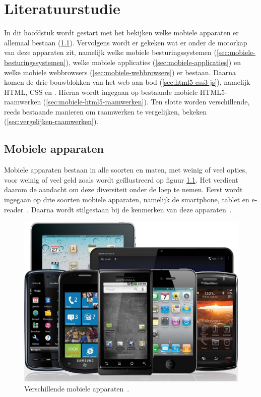 \chapter{Literatuurstudie}
\label{chap:literatuurstudie}
In dit hoofdstuk wordt gestart met het bekijken welke mobiele apparaten er allemaal bestaan (\ref{sec:mobiele-apparaten}). 
Vervolgens wordt er gekeken wat er onder de motorkap van deze apparaten zit, namelijk welke mobiele besturingssystemen (\ref{sec:mobiele-besturingssystemen}), welke mobiele applicaties (\ref{sec:mobiele-applicaties}) en welke mobiele webbrowsers (\ref{sec:mobiele-webbrowsers}) er bestaan. 
Daarna komen de drie bouwblokken van het web aan bod (\ref{sec:html5-css3-js}), namelijk HTML, CSS en \js{}.
Hierna wordt ingegaan op bestaande mobiele HTML5-raamwerken (\ref{sec:mobiele-html5-raamwerken}).  
Ten slotte worden verschillende, reeds bestaande manieren om raamwerken te vergelijken, bekeken (\ref{sec:vergelijken-raamwerken}).


\section{Mobiele apparaten}
\label{sec:mobiele-apparaten}
Mobiele apparaten bestaan in alle soorten en maten, met weinig of veel opties, voor weinig of veel geld zoals wordt geïllustreerd op figuur \ref{fig:devices}. 
Het verdient daarom de aandacht om deze diversiteit onder de loep te nemen. 
Eerst wordt ingegaan op drie soorten mobiele apparaten, namelijk de smartphone, tablet en e-reader~\cite{GCF2013}.
Daarna wordt stilgestaan bij de kenmerken van deze apparaten~\cite{PhilDutson2012}.

\begin{figure}
  \centering
  \includegraphics[height=0.6\textwidth]{figuren/mobile-devices.jpg}
  \caption{Verschillende mobiele apparaten~\cite{Grady2013}.}
  \label{fig:devices}
\end{figure}

